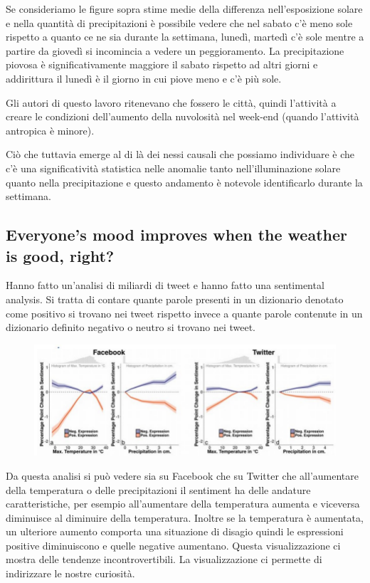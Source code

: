 \documentclass[12pt,a4paper]{report}
\begin{document}
Se consideriamo le figure sopra stime medie della differenza nell'esposizione solare e nella quantità di precipitazioni è possibile vedere che nel sabato c'è meno sole rispetto a quanto ce ne sia durante la settimana, lunedì, martedì c'è sole mentre a partire da giovedì si incomincia a vedere un peggioramento. La precipitazione piovosa è significativamente maggiore il sabato rispetto ad altri giorni e addirittura il lunedì è il giorno in cui piove meno e c'è più sole. 

Gli autori di questo lavoro ritenevano che fossero le città, quindi l'attività a creare le condizioni dell'aumento della nuvolosità nel week-end (quando l'attività antropica è minore).

Ciò che tuttavia emerge al di là dei nessi causali che possiamo individuare è che c'è una significatività statistica nelle anomalie tanto nell'illuminazione solare quanto nella precipitazione e questo andamento è notevole identificarlo durante la settimana. 

\subsection{Everyone's mood improves when the weather is good, right?}

Hanno fatto un'analisi di miliardi di tweet e hanno fatto una sentimental analysis. Si tratta di contare quante parole presenti in un dizionario denotato come positivo si trovano nei tweet rispetto invece a quante parole contenute in un dizionario definito negativo o neutro si trovano nei tweet. 
\begin{figure}[h]
	\centering
	\includegraphics[width=0.5\linewidth]{imgs datavis/Facebook vs Twitter.png}
	\caption{}
	\label{fig:FvsT}
\end{figure} 

Da questa analisi si può vedere  sia su Facebook che su Twitter che all'aumentare della temperatura o delle precipitazioni il sentiment ha delle andature caratteristiche, per esempio all'aumentare della temperatura aumenta e viceversa diminuisce al diminuire della temperatura. Inoltre se la temperatura è aumentata, un ulteriore aumento comporta una situazione di disagio quindi le espressioni positive diminuiscono e quelle negative aumentano. Questa visualizzazione ci mostra delle tendenze incontrovertibili. La visualizzazione ci permette di indirizzare le nostre curiosità. 
\end{document}
